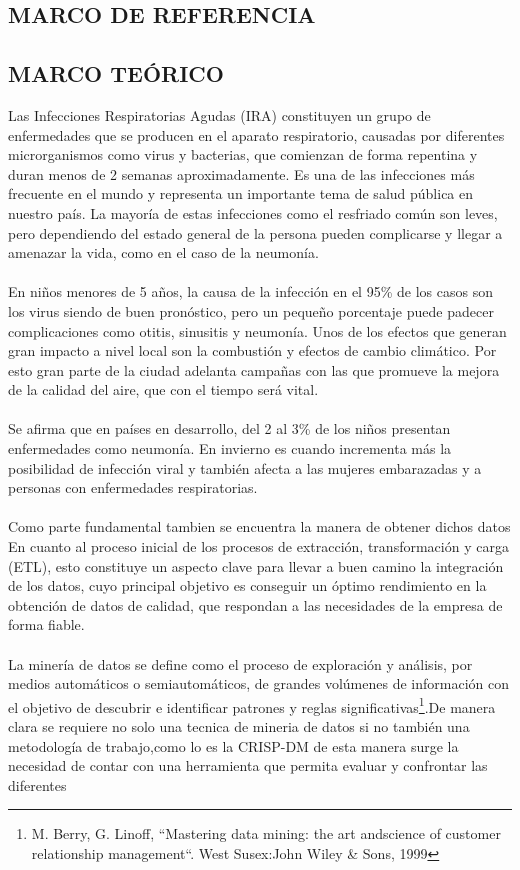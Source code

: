 \documentclass[a4paper,openright,12pt]{book}
\theoremstyle{definition}
\theoremstyle{remark}
\begin{document}
\begin{center}
 \chapter{MARCO DE REFERENCIA}\label{cap.referencia}
\end{center}

\section{MARCO TEÓRICO}

Las Infecciones Respiratorias Agudas (IRA) constituyen un grupo de enfermedades que se producen en el aparato respiratorio, causadas por diferentes microrganismos como virus y bacterias, que comienzan de forma repentina y duran menos de 2 semanas aproximadamente. Es una de las infecciones más frecuente en el mundo y representa un importante tema de salud pública en nuestro país.  La mayoría de estas infecciones como el resfriado común son leves, pero dependiendo del estado general de la persona pueden complicarse y llegar a amenazar la vida, como en el caso de la neumonía.\\\\
En niños menores de 5 años, la causa de la infección en el  95\% de los casos son los virus siendo de buen pronóstico, pero un pequeño porcentaje puede padecer complicaciones como  otitis, sinusitis y neumonía. Unos de los efectos que generan gran impacto a nivel local son  la combustión y efectos de cambio climático. Por esto  gran parte de la ciudad adelanta campañas con las que promueve la mejora de la calidad del aire, que con el tiempo será vital.\\\\
Se afirma que en países en desarrollo, del 2 al 3\% de los niños presentan enfermedades como neumonía. En invierno es cuando incrementa más la posibilidad de infección viral y también afecta a las mujeres embarazadas y a personas con enfermedades respiratorias.\\\\
Como parte fundamental tambien se encuentra la manera de obtener dichos datos En cuanto al proceso inicial de los procesos de extracción, transformación y carga (ETL), esto constituye un aspecto clave para llevar a buen camino la integración de los datos, cuyo principal objetivo es conseguir un óptimo rendimiento en la obtención de datos de calidad, que respondan a las necesidades de la empresa de forma fiable.\\\\
La minería de datos se define como el proceso de exploración y análisis, por medios automáticos o semiautomáticos, de grandes volúmenes de información con el objetivo de descubrir e identificar patrones y reglas
significativas\footnote{M. Berry, G. Linoff, “Mastering data mining: the art andscience of customer relationship management“. West Susex:John Wiley \& Sons, 1999}.De manera clara se requiere no solo una tecnica de mineria de datos si no también una metodología de trabajo,como lo es la CRISP-DM de esta manera surge la necesidad de contar con una herramienta que permita evaluar y confrontar las diferentes 
\end{document}
